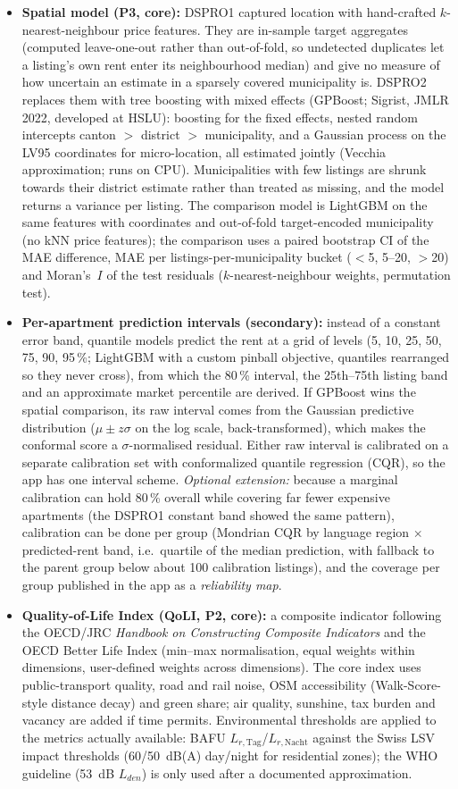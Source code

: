 \documentclass[11pt,a4paper]{article}
\begin{document}
\begin{itemize}
    \item \textbf{Spatial model (P3, core):} DSPRO1 captured location with hand-crafted $k$-nearest-neighbour price features. They are in-sample target aggregates (computed leave-one-out rather than out-of-fold, so undetected duplicates let a listing's own rent enter its neighbourhood median) and give no measure of how uncertain an estimate in a sparsely covered municipality is. DSPRO2 replaces them with tree boosting with mixed effects (GPBoost; Sigrist, JMLR 2022, developed at HSLU): boosting for the fixed effects, nested random intercepts canton $>$ district $>$ municipality, and a Gaussian process on the LV95 coordinates for micro-location, all estimated jointly (Vecchia approximation; runs on CPU). Municipalities with few listings are shrunk towards their district estimate rather than treated as missing, and the model returns a variance per listing. The comparison model is LightGBM on the same features with coordinates and out-of-fold target-encoded municipality (no kNN price features); the comparison uses a paired bootstrap CI of the MAE difference, MAE per listings-per-municipality bucket ($<$5, 5--20, $>$20) and Moran's~$I$ of the test residuals ($k$-nearest-neighbour weights, permutation test).
    \item \textbf{Per-apartment prediction intervals (secondary):} instead of a constant error band, quantile models predict the rent at a grid of levels (5, 10, 25, 50, 75, 90, 95\,\%; LightGBM with a custom pinball objective, quantiles rearranged so they never cross), from which the 80\,\% interval, the 25th--75th listing band and an approximate market percentile are derived. If GPBoost wins the spatial comparison, its raw interval comes from the Gaussian predictive distribution ($\mu \pm z\sigma$ on the log scale, back-transformed), which makes the conformal score a $\sigma$-normalised residual. Either raw interval is calibrated on a separate calibration set with conformalized quantile regression (CQR), so the app has one interval scheme. \emph{Optional extension:} because a marginal calibration can hold 80\,\% overall while covering far fewer expensive apartments (the DSPRO1 constant band showed the same pattern), calibration can be done per group (Mondrian CQR by language region $\times$ predicted-rent band, i.e.\ quartile of the median prediction, with fallback to the parent group below about 100 calibration listings), and the coverage per group published in the app as a \emph{reliability map}.
    \item \textbf{Quality-of-Life Index (QoLI, P2, core):} a composite indicator following the OECD/JRC \emph{Handbook on Constructing Composite Indicators} and the OECD Better Life Index (min--max normalisation, equal weights within dimensions, user-defined weights across dimensions). The core index uses public-transport quality, road and rail noise, OSM accessibility (Walk-Score-style distance decay) and green share; air quality, sunshine, tax burden and vacancy are added if time permits. Environmental thresholds are applied to the metrics actually available: BAFU $L_{r,\mathrm{Tag}}$/$L_{r,\mathrm{Nacht}}$ against the Swiss LSV impact thresholds (60/50~dB(A) day/night for residential zones); the WHO guideline (53~dB $L_{den}$) is only used after a documented approximation.

\end{itemize}
\end{document}
